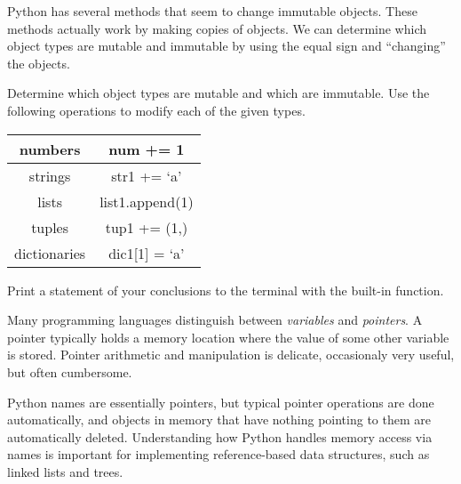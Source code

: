 \begin{problem}
Python has several methods that seem to change immutable objects.
These methods actually work by making copies of objects.
We can determine which object types are mutable and immutable by using the equal sign and ``changing'' the objects.
\begin{comment}
Consider the following.
\begin{lstlisting}
>>> list_1 = [1,2,3]
>>> list_2 = list_1
>>> list_1.append(4)
>>> print(list_1)
[1, 2, 3, 4]
>>> print(list_2)
[1, 2, 3, 4]
\end{lstlisting}
Since \li{list_1} and \li{list_2} are the same, we conclude that lists are mutable.
If the variables were different, it would indicate that the structure is immutable and a copy was made.
Performing a similar operation on a tuple yields a different result.
\begin{lstlisting}
>>> tuple_1 = (1,2,3)
>>> tuple_2 = tuple_1
>>> tuple_1 = tuple_1 + (4,)
>>> print(tuple_1)
(1, 2, 3, 4)
>>> print(tuple_2)
(1, 2, 3)
\end{lstlisting}
\end{comment}

Determine which object types are mutable and which are immutable.
Use the following operations to modify each of the given types.
\begin{center}
\begin{tabular}{|c|c|}
\hline
numbers & num += 1 \\
\hline
strings & str1 += `a' \\
\hline
lists & list1.append(1) \\
\hline
tuples & tup1 += (1,) \\
\hline
dictionaries & dic1[1] = `a' \\
\hline
\end{tabular}
\end{center}

Print a statement of your conclusions to the terminal with the built-in  function.
\end{problem}

\begin{info}
Many programming languages distinguish between \emph{variables} and \emph{pointers}.
A pointer typically holds a memory location where the value of some other variable is stored.
Pointer arithmetic and manipulation is delicate, occasionaly very useful, but often cumbersome.

Python names are essentially pointers, but typical pointer operations are done automatically, and objects in memory that have nothing pointing to them are automatically deleted.
Understanding how Python handles memory access via names is important for implementing reference-based data structures, such as linked lists and trees.
\end{info}

